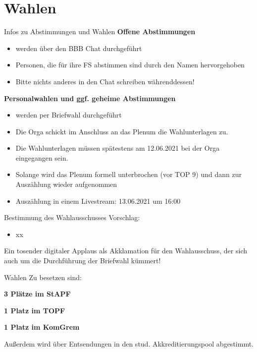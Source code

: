 \documentclass[compress, aspectratio=169]{beamer}
\begin{document}
\section{Wahlen}

\begin{frame}{Infos zu Abstimmungen und Wahlen}
\textbf{Offene Abstimmungen}
\begin{itemize}
\item werden über den BBB Chat durchgeführt
\item Personen, die für ihre FS abstimmen sind durch den Namen hervorgehoben
\item Bitte nichts anderes in den Chat schreiben währenddessen!
\end{itemize}
\textbf{Personalwahlen und ggf. geheime Abstimmungen}
\begin{itemize}
\item werden per Briefwahl durchgeführt
\item Die Orga schickt im Anschluss an das Plenum die Wahlunterlagen zu.
\item Die Wahlunterlagen müssen spätestens am 12.06.2021 bei der Orga eingegangen sein.
\item Solange wird das Plenum formell unterbrochen (vor TOP 9) und dann zur Auszählung wieder aufgenommen
\item Auszählung in einem Livestream: 13.06.2021 um 16:00
\end{itemize}
\end{frame}

\begin{frame}{Bestimmung des Wahlausschusses}
Vorschlag:
\begin{itemize}
\item xx
\end{itemize}

\vspace{.5cm}
Ein tosender digitaler Applaus als Akklamation für den Wahlausschuss, der sich auch um die Durchführung der Briefwahl kümmert!
\end{frame}

\begin{frame}{Wahlen}
Zu besetzen sind:\vspace{.5cm}

\textbf{3 Plätze im StAPF}\vspace{.5cm}

\textbf{1 Platz im TOPF}\vspace{.5cm}

\textbf{1 Platz im KomGrem}\vspace{.5cm}

Außerdem wird über Entsendungen in den stud. Akkreditierungspool abgestimmt.
\end{frame}
\end{document}
